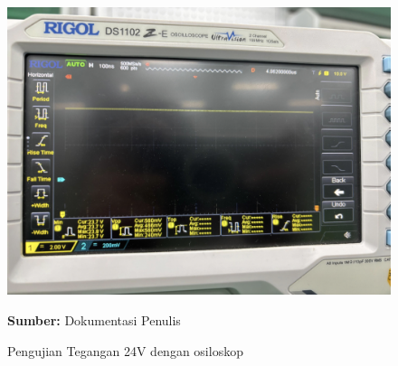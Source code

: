 \begin{figure}[H]
	\centering
	\includegraphics[scale=0.5]{gambar/bab4/osii.png}
	\caption{Pengujian Tegangan 24V dengan osiloskop}
	\label{fig:pengujian_tegangan} \footnotesize{\textbf{Sumber:} Dokumentasi Penulis}
\end{figure}

